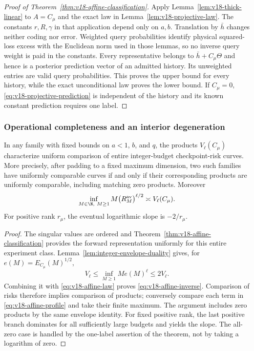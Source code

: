 \begin{proof}[Proof of Theorem~\ref{thm:v18-affine-classification}]
Apply Lemma~\ref{lem:v18-thick-linear} to $A=C_\mu$ and the exact law
in Lemma~\ref{lem:v18-projective-law}. The constants $r,R,\gamma$ in
that application depend only on $a,b$. Translation by $\bar h$ changes
neither coding nor error. Weighted query probabilities identify physical
squared-loss excess with the Euclidean norm used in those lemmas, so no
inverse query weight is paid in the constants. Every representative
belongs to $\bar h+C_\mu\Theta$ and hence is a posterior prediction
vector of an admitted history. Its unweighted entries are valid query
probabilities. This proves the upper bound for every history, while
the exact unconditional law proves the lower bound. If $C_\mu=0$,
\eqref{eq:v18-projective-prediction} is independent of the history and
its known constant prediction requires one label.
\end{proof}

\subsubsection{Operational completeness and an interior degeneration}
\begin{corollary}
\label{cor:v18-affine-invariant}
In any family with fixed bounds on $a<1$, $b$, and $q$, the products
$V_\ell(C_\mu)$ characterize uniform comparison of entire integer-budget
checkpoint-risk curves. More precisely, after padding to a fixed maximum
dimension, two such families have uniformly comparable curves if and
only if their corresponding products are uniformly comparable,
including matching zero products. Moreover
\begin{equation}\label{eq:v18-affine-inverse}
 \inf_{M\in\N,\ M\ge1}M\bigl(R^{\mathrm{av}}_M\bigr)^{\ell/2}
 \asymp V_\ell(C_\mu).
\end{equation}
For positive rank $r_\mu$, the eventual logarithmic slope is $-2/r_\mu$.
\end{corollary}
\begin{proof}
The singular values are ordered and Theorem~\ref{thm:v18-affine-classification}
provides the forward representation uniformly for this entire experiment
class. Lemma~\ref{lem:integer-envelope-duality} gives, for
$e(M)=E_{C_\mu}(M)^{1/2}$,
\[
 V_\ell\le\inf_{M\ge1}Me(M)^\ell\le2V_\ell.
\]
Combining it with \eqref{eq:v18-affine-law} proves
\eqref{eq:v18-affine-inverse}. Comparison of risks therefore implies
comparison of products; conversely compare each term in
\eqref{eq:v18-affine-profile} and take their finite maximum.
The argument includes zero products by the same envelope identity.
For fixed positive rank, the last positive branch dominates for all
sufficiently large budgets and yields the slope. The all-zero case is
handled by the one-label assertion of the theorem, not by taking a
logarithm of zero.
\end{proof}

